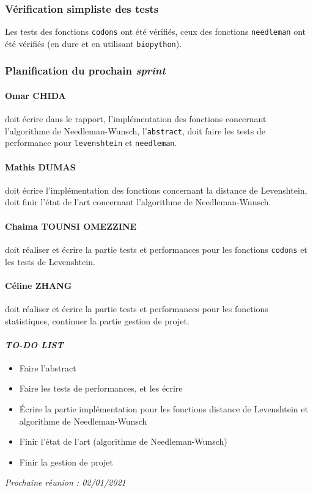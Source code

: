 \subsubsection*{Vérification simpliste des tests}
Les tests des fonctions \texttt{codons} ont été vérifiés, ceux des fonctions \texttt{needleman} ont été vérifiés (en dure et en utilisant \texttt{biopython}).

\subsubsection*{Planification du prochain \textsl{sprint}}
\paragraph*{Omar CHIDA} doit écrire dans le rapport, l'implémentation des fonctions concernant l'algorithme de Needleman-Wunsch, l'\texttt{abstract}, doit faire les tests de performance pour \texttt{levenshtein} et \texttt{needleman}.

\paragraph*{Mathis DUMAS} doit écrire l'implémentation des fonctions concernant la distance de Levenshtein, doit finir l'état de l'art concernant l'algorithme de Needleman-Wunsch.

\paragraph*{Chaima TOUNSI OMEZZINE} doit réaliser et écrire la partie tests et performances pour les fonctions \texttt{codons} et les tests de Levenshtein.

\paragraph*{Céline ZHANG} doit réaliser et écrire la partie tests et performances pour les fonctions statistiques, continuer la partie gestion de projet.

\paragraph{\emph{TO-DO LIST}}
\begin{itemize}
    \item Faire l'abstract
    \item Faire les tests de performances, et les écrire
    \item Écrire la partie implémentation pour les fonctions distance de Levenshtein et algorithme de Needleman-Wunsch
    \item Finir l'état de l'art (algorithme de Needleman-Wunsch)
    \item Finir la gestion de projet
\end{itemize}

\emph{Prochaine réunion : 02/01/2021}\\

% 